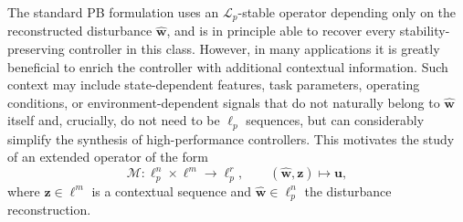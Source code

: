 \documentclass[journal,twoside,web]{ieeecolor}
\newcommand{\disturbance}{\mathbf{\widehat w}}
\newcommand{\operator}{\mathcal{M}}
\begin{document}

The standard PB formulation uses an \(\mathcal{L}_p\)-stable operator depending only on the reconstructed
disturbance \(\disturbance\), and is in principle able to recover every stability-preserving controller
in this class. However, in many applications it is greatly beneficial to enrich the controller with additional
contextual information. Such context may include state-dependent features, task parameters, operating
conditions, or environment-dependent signals that do not naturally belong to \(\disturbance\) itself and, crucially, do not need to be $ \ell_p$ sequences,
but can considerably simplify the synthesis of high-performance controllers. This motivates the study
of an extended operator of the form
\[
\operator:\ell_p^n\times \ell^m \to \ell_p^r,
\qquad
(\disturbance,\mathbf z)\mapsto \mathbf{u},
\]
where 
\(\mathbf z\in\ell^m\) is a contextual sequence and \(\disturbance\in\ell_p^n\) the disturbance reconstruction.
\end{document}
